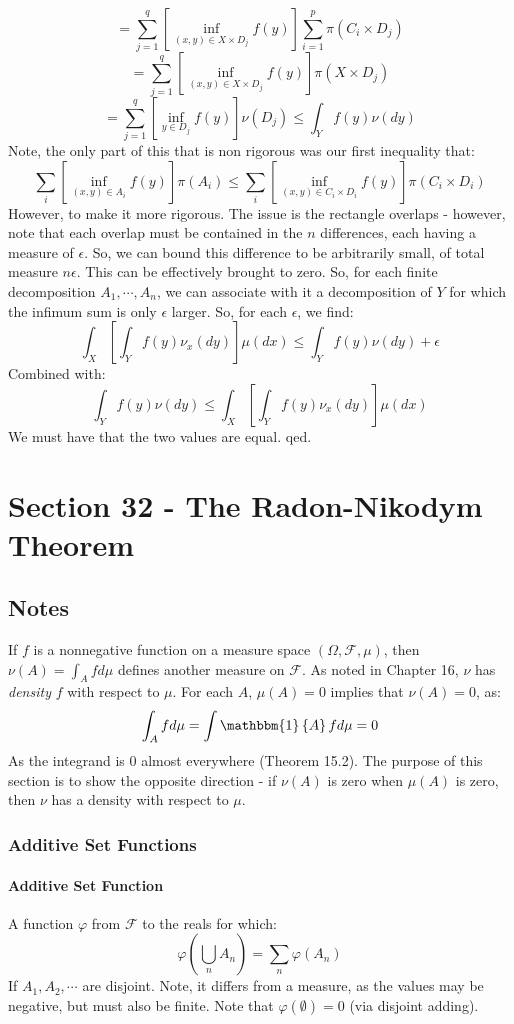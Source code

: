 \documentclass[12pt,a4paper]{article}
\newcommand{\1}[1]{\mathbbm{1}\left\{ #1 \right\}}
\newcommand{\fcal}{\mathcal{F}}
\begin{document}
\begin{enumerate}
$$	$$
	$$
		= \sum_{j=1}^q \left[\inf_{(x,y) \in X \times D_j} f(y)\right] \sum_{i=1}^p \pi(C_i \times D_j)
	$$
	$$
		= \sum_{j=1}^q \left[\inf_{(x,y) \in X \times D_j} f(y)\right] \pi(X \times D_j)
	$$
	$$
		= \sum_{j=1}^q \left[\inf_{y \in D_j} f(y)\right] \nu(D_j) \leq \int_Y f(y) \nu(dy)
	$$
	Note, the only part of this that is non rigorous was our first inequality that:
	$$
		\sum_i \left[\inf_{(x,y) \in A_i} f(y)\right] \pi(A_i) \leq
		\sum_i \left[\inf_{(x,y) \in C_i \times D_i} f(y)\right] \pi(C_i \times D_i)
	$$
	However, to make it more rigorous. The issue is the rectangle overlaps - however, note that each overlap must be contained in the $n$ differences, each having a measure of $\epsilon$. So, we can bound this difference to be arbitrarily small, of total measure $n\epsilon$. This can be effectively brought to zero. So, for each finite decomposition $A_1, \cdots, A_n$, we can associate with it a decomposition of $Y$ for which the infimum sum is only $\epsilon$ larger. So, for each $\epsilon$, we find:
	$$
		\int_X\left[\int_Y f(y) \nu_x(dy)\right]\mu(dx) \leq \int_Y f(y) \nu(dy) + \epsilon
	$$
	Combined with:
	$$
		\int_Y f(y) \nu(dy) \leq \int_X\left[\int_Y f(y) \nu_x(dy)\right]\mu(dx)
	$$
	We must have that the two values are equal. qed.
		
\end{enumerate}

\section{Section 32 - The Radon-Nikodym Theorem}
\subsection{Notes}
If $f$ is a nonnegative function on a measure space $(\Omega, \fcal, \mu)$, then $\nu(A) = \int_A f d\mu$ defines another measure on $\fcal$. As noted in Chapter 16, $\nu$ has \textit{density} $f$ with respect to $\mu$. For each $A$, $\mu(A) = 0$ implies that $\nu(A) = 0$, as:
$$
	\int_A f d\mu = \int \1{A} f d\mu = 0
$$
As the integrand is $0$ almost everywhere (Theorem 15.2). The purpose of this section is to show the opposite direction - if $\nu(A)$ is zero when $\mu(A)$ is zero, then $\nu$ has a density with respect to $\mu$.

\subsubsection{Additive Set Functions} 
\paragraph{Additive Set Function} A function $\varphi$ from $\fcal$ to the reals for which:
$$
	\varphi\left(\bigcup_n A_n\right) = \sum_n \varphi(A_n)
$$
If $A_1, A_2, \cdots$ are disjoint. Note, it differs from a measure, as the values may be negative, but must also be finite. Note that $\varphi(\emptyset) = 0$ (via disjoint adding).
\end{document}
